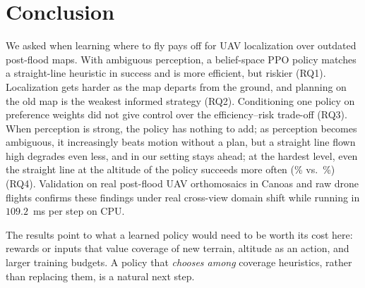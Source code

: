 \section{Conclusion}
\label{sec:conclusion}

We asked when learning where to fly pays off for UAV localization over outdated post-flood maps. With ambiguous perception, a belief-space PPO policy matches a straight-line heuristic in success and is more efficient, but riskier (RQ1). Localization gets harder as the map departs from the ground, and planning on the old map is the weakest informed strategy (RQ2). Conditioning one policy on preference weights did not give control over the efficiency--risk trade-off (RQ3). When perception is strong, the policy has nothing to add; as perception becomes ambiguous, it increasingly beats motion without a plan, but a straight line flown high degrades even less, and in our setting stays ahead; at the hardest level, even the straight line at the altitude of the policy succeeds more often (\eSuccStraightLThree\% vs.\ \eSuccPpoLThree\%) (RQ4). Validation on real post-flood UAV orthomosaics in Canoas and raw drone flights confirms these findings under real cross-view domain shift while running in $109.2$~ms per step on CPU.

The results point to what a learned policy would need to be worth its cost here: rewards or inputs that value coverage of new terrain, altitude as an action, and larger training budgets. A policy that \emph{chooses among} coverage heuristics, rather than replacing them, is a natural next step.
